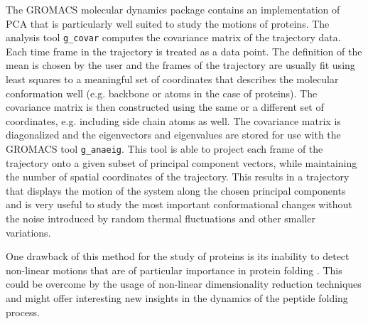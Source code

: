 \documentclass[english, a4paper, 12pt, titlepage, draft]{article}
\begin{document}
The GROMACS molecular dynamics package \cite{GROMACS4} contains an implementation of PCA that is particularly well suited to study the motions of proteins.
The analysis tool \texttt{g\_covar} computes the covariance matrix of the trajectory data.
Each time frame in the trajectory is treated as a data point.
The definition of the mean is chosen by the user and the frames of the trajectory are usually fit using least squares to a meaningful set of coordinates that describes the molecular conformation well (e.g. backbone or  atoms in the case of proteins).
The covariance matrix is then constructed using the same or a different set of coordinates, e.g. including side chain atoms as well.
The covariance matrix is diagonalized and the eigenvectors and eigenvalues are stored for use with the GROMACS tool \texttt{g\_anaeig}.
This tool is able to project each frame of the trajectory onto a given subset of principal component vectors, while maintaining the number of spatial coordinates of the trajectory.
This results in a trajectory that displays the motion of the system along the chosen principal components and is very useful to study the most important conformational changes without the noise introduced by random thermal fluctuations and other smaller variations.

One drawback of this method for the study of proteins is its inability to detect non-linear motions that are of particular importance in protein folding \cite{SciMAP}.
This could be overcome by the usage of non-linear dimensionality reduction techniques and might offer interesting new insights in the dynamics of the peptide folding process.
\end{document}
